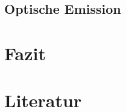 \documentclass[12pt,a4paper]{scrartcl}
\numberwithin{equation}{section} %
\begin{document}
\subsection{Optische Emission}
\label{Optische Emission}

\clearpage
\hypertarget{fazit}{%
\section{Fazit}\label{fazit}}

\clearpage
\hypertarget{literatur}{%
\section{Literatur}\label{literatur}}
\renewcommand{\section}[2]{} %
\end{document}
